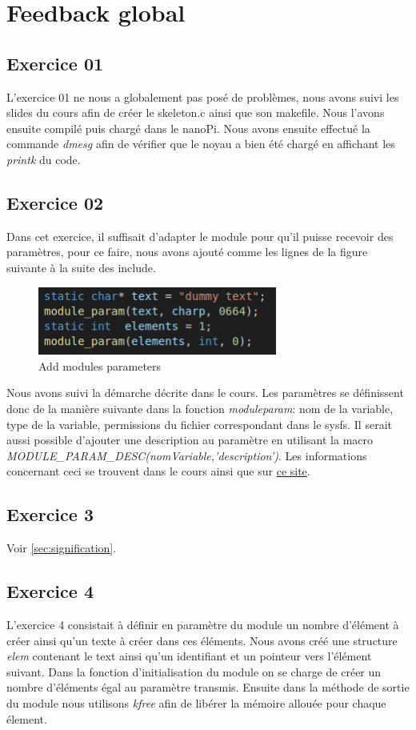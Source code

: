 \documentclass{ReportTemplate}
\begin{document}
\section{Feedback global}
\subsection{Exercice 01}
L'exercice 01 ne nous a globalement pas posé de problèmes, nous avons suivi les
slides du cours afin de créer le skeleton.c ainsi que son makefile. Nous l'avons
ensuite compilé puis chargé dans le nanoPi. Nous avons ensuite effectué la
commande \textit{dmesg} afin de vérifier que le noyau a bien été chargé en
affichant les \textit{printk} du code.
\subsection{Exercice 02}
Dans cet exercice, il suffisait d'adapter le module pour qu'il puisse recevoir
des paramètres, pour ce faire, nous avons ajouté comme les lignes de la figure
suivante à la suite des include.
\begin{figure}[H]
    \centering
    \includegraphics[width=0.7\textwidth]{imageSources/ModuleParams.png}
    \caption{Add modules parameters}
    \label{fig:ModuleParams}
\end{figure}
Nous avons suivi la démarche décrite dans le cours. Les paramètres se
définissent donc de la manière suivante dans la fonction \textit{moduleparam}: \newline
nom de la variable, type de la variable, permissions du fichier correspondant
dans le sysfs. Il serait aussi possible d'ajouter une description au paramètre
en utilisant la macro \textit{MODULE\_PARAM\_DESC(nomVariable,'description')}. Les
informations concernant ceci se trouvent dans le cours ainsi que sur
\href{https://linuxkernel51.blogspot.com/2011/03/use-of-module-parameters-in-kernel.html}{ce
site}.
\newpage
\subsection{Exercice 3}
Voir \ref{sec:signification}.
\subsection{Exercice 4}
L'exercice 4 consistait à définir en paramètre du module un nombre d'élément à
créer ainsi qu'un texte à créer dans ces éléments. Nous avons créé une structure
\textit{elem} contenant le text ainsi qu'un identifiant et un pointeur vers
l'élément suivant. Dans la fonction d'initialisation du module on se charge de
créer un nombre d'éléments égal au paramètre transmis. Ensuite dans la méthode
de sortie du module nous utilisons \textit{kfree} afin de libérer la mémoire
allouée pour chaque élement.
\end{document}
